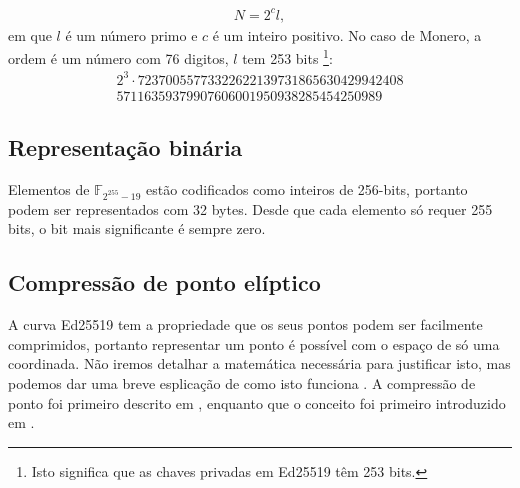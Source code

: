 \begin{enumerate}
\vspace{.175cm}
\begin{align*}
N=2^c l ,
\end{align*}
em que $l$ é um número primo e $c$ é um inteiro positivo. No caso de Monero, a ordem é um número com 76 digitos, $l$ tem 253 bits \footnote{Isto significa que as chaves privadas em Ed25519 têm 253 bits.}: 
\vspace{.175cm}
\begin{align*}
2^3 \cdot 72370055773322622139731865630429942408\\57116359379907606001950938285454250989
\end{align*}
\]


\subsection{Representação binária}
\label{binary_note}
Elementos de \(\mathbb{F}_{2^{255} - 19} \) estão codificados como inteiros de 256-bits, portanto podem ser representados com 32 bytes. Desde que cada elemento só requer 255 bits, o bit mais significante é sempre zero. 


\subsection{Compressão de ponto elíptico}
\label{point_compression_section}

A curva Ed25519 tem a propriedade que os seus pontos podem ser facilmente comprimidos, portanto representar um ponto é possível com o espaço de só uma coordinada. Não iremos detalhar a matemática necessária para justificar isto, mas podemos dar uma breve esplicação de como isto funciona \cite{eddsa-ed25519-irtf}. A compressão de ponto foi primeiro descrito em \cite{Bernstein2012}, enquanto que o conceito foi primeiro introduzido em \cite{Miller:point-compression-origin}.


\end{enumerate}
